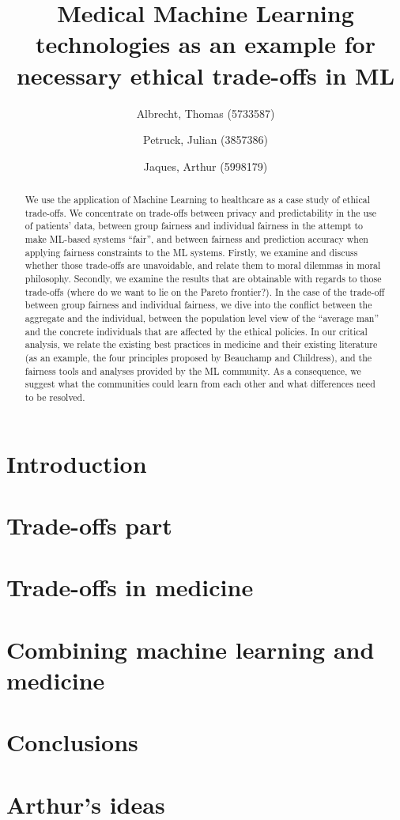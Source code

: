 \documentclass[11pt,english]{article}
\title{Medical Machine Learning technologies as an example for necessary ethical trade-offs in ML}
\author{
    Albrecht, Thomas (5733587)
    \and
    Petruck, Julian (3857386)
    \and
    Jaques, Arthur (5998179)}
\begin{document}
\maketitle

\begin{abstract}
	We use the application of Machine Learning to healthcare as a case study of ethical trade-offs.
	We concentrate on trade-offs between privacy and predictability in the use of patients' data, between group fairness and individual fairness in the attempt to make ML-based systems ``fair'', and between fairness and prediction accuracy when applying fairness constraints to the ML systems.
	Firstly, we examine and discuss whether those trade-offs are unavoidable, and relate them to moral dilemmas in moral philosophy.
	Secondly, we examine the results that are obtainable with regards to those trade-offs (where do we want to lie on the Pareto frontier?).
	In the case of the trade-off between group fairness and individual fairness, we dive into the conflict between the aggregate and the individual, between the population level view of the ``average man'' and the concrete individuals that are affected by the ethical policies.
	In our critical analysis, we relate the existing best practices in medicine and their existing literature (as an example, the four principles proposed by Beauchamp and Childress), and the fairness tools and analyses provided by the ML community.
	As a consequence, we suggest what the communities could learn from each other and what differences need to be resolved.
\end{abstract}


\setcounter{tocdepth}{2}
\tableofcontents



\section{Introduction}


\section{Trade-offs part}


\section{Trade-offs in medicine}


\section{Combining machine learning and medicine}


\section{Conclusions}


\section{Arthur's ideas}

\clearpage


\printbibliography
\end{document}
